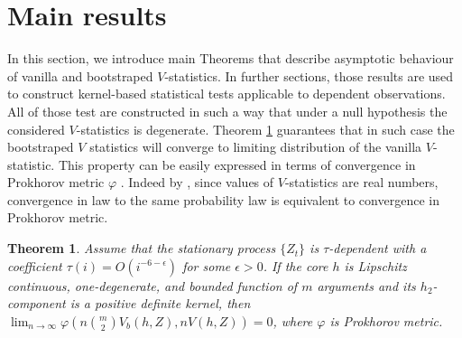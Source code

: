 \documentclass{article} %
\newtheorem{Theorem}{Theorem}
\begin{document}
\section{Main results}\label{sec:main}
In this section, we introduce main Theorems that describe asymptotic behaviour of vanilla and bootstraped $V$-statistics. In further sections, those results are used to construct kernel-based statistical tests applicable to dependent observations. All of those test are constructed in such a way that under a null hypothesis the considered $V$-statistics is degenerate. Theorem \ref{th:mainOne} guarantees that in such case the bootstraped $V$ statistics will converge to limiting  distribution of the vanilla $V$-statistic. This property can be easily expressed  in terms of convergence in Prokhorov metric $\varphi$ \cite[Section 11.3]{dudley2002real}. Indeed by \cite[Theorem 11.3.3]{dudley2002real}, since values of $V$-statistics are real numbers, convergence in law to the same probability law is equivalent to convergence in Prokhorov metric. 

\begin{Theorem}
\label{th:mainOne}
Assume that the stationary process $\{Z_t\}$ is $\tau$-dependent with a coefficient $\tau(i) = O(i^{-6-\epsilon})$ for some $\epsilon>0$. If the core $h$ is Lipschitz continuous, one-degenerate, and bounded function of $m$ arguments and its $h_2$-component is a positive definite kernel, then $\lim_{n \to \infty} \varphi(n \binom m 2 V_b(h,Z),n V(h,Z)) = 0$, where $\varphi$ is Prokhorov metric. 
\end{Theorem}
\end{document}
